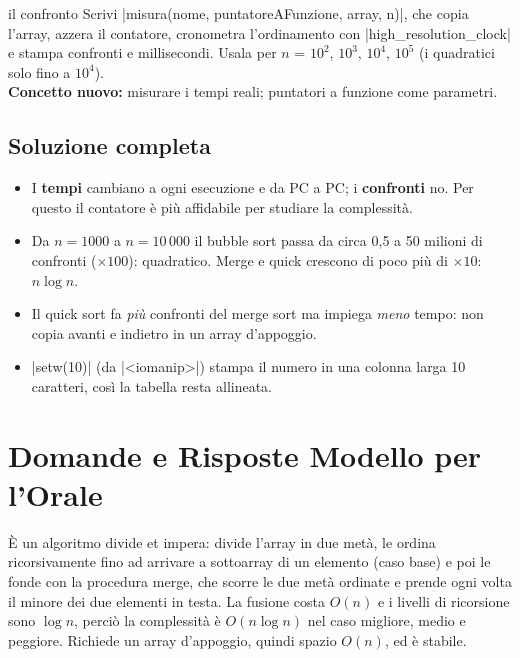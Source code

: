 \begin{step}{il confronto}
Scrivi \cc|misura(nome, puntatoreAFunzione, array, n)|, che copia l'array, azzera
il contatore, cronometra l'ordinamento con \cc|high_resolution_clock| e stampa
confronti e millisecondi. Usala per $n$ = $10^2$, $10^3$, $10^4$, $10^5$ (i quadratici
solo fino a $10^4$).\\[0.3em]
\textbf{Concetto nuovo:} misurare i tempi reali; puntatori a funzione come parametri.
\end{step}

\subsection*{Soluzione completa}

\begin{consiglio}
\begin{itemize}
  \item I \textbf{tempi} cambiano a ogni esecuzione e da PC a PC; i
        \textbf{confronti} no. Per questo il contatore è più affidabile per studiare la
        complessità.
  \item Da $n = 1000$ a $n = 10\,000$ il bubble sort passa da circa 0{,}5 a 50 milioni
        di confronti ($\times 100$): quadratico. Merge e quick crescono di poco più di
        $\times 10$: $n \log n$.
  \item Il quick sort fa \emph{più} confronti del merge sort ma impiega \emph{meno}
        tempo: non copia avanti e indietro in un array d'appoggio.
  \item \cc|setw(10)| (da \cc|<iomanip>|) stampa il numero in una colonna larga 10
        caratteri, così la tabella resta allineata.
\end{itemize}
\end{consiglio}

\section{Domande e Risposte Modello per l'Orale}

\begin{orale}
È un algoritmo divide et impera: divide l'array in due metà, le ordina
ricorsivamente fino ad arrivare a sottoarray di un elemento (caso base) e poi le
fonde con la procedura merge, che scorre le due metà ordinate e prende ogni volta il
minore dei due elementi in testa. La fusione costa $O(n)$ e i livelli di ricorsione
sono $\log n$, perciò la complessità è $O(n \log n)$ nel caso migliore, medio e
peggiore. Richiede un array d'appoggio, quindi spazio $O(n)$, ed è stabile.
\end{orale}

